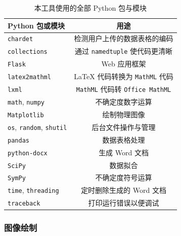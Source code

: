 \begin{table}[htbp]
  \caption{本工具使用的全部 Python 包与模块}
  \label{tab:pkg}
  \vskip 0.1in
  \centering\small
  \begin{tabular}{lc}
  \toprule
  Python 包或模块 & 用途 \\
  \midrule
  \verb|chardet| & 检测用户上传的数据表格的编码 \\
  \verb|collections| & 通过 \verb|namedtuple| 使代码更清晰 \\
  \verb|Flask| & Web 应用框架 \\
  \verb|latex2mathml| & \LaTeX{} 代码转换为 \verb|MathML| 代码 \\
  \verb|lxml| & \verb|MathML| 代码转 \verb|Office MathML| \\
  \verb|math|, \verb|numpy| & 不确定度数字运算 \\
  \verb|Matplotlib| & 绘制物理图像 \\
  \verb|os|, \verb|random|, \verb|shutil| & 后台文件操作与管理 \\
  \verb|pandas| & 数据表格处理 \\
  \verb|python-docx| & 生成 Word 文档 \\
  \verb|SciPy| & 数据拟合 \\
  \verb|SymPy| & 不确定度符号运算 \\
  \verb|time|, \verb|threading| & 定时删除生成的 Word 文档 \\
  \verb|traceback| & 打印运行错误以便调试 \\
  \bottomrule
  \end{tabular}
  \vskip -0.1in
\end{table}

\subsubsection{图像绘制}

